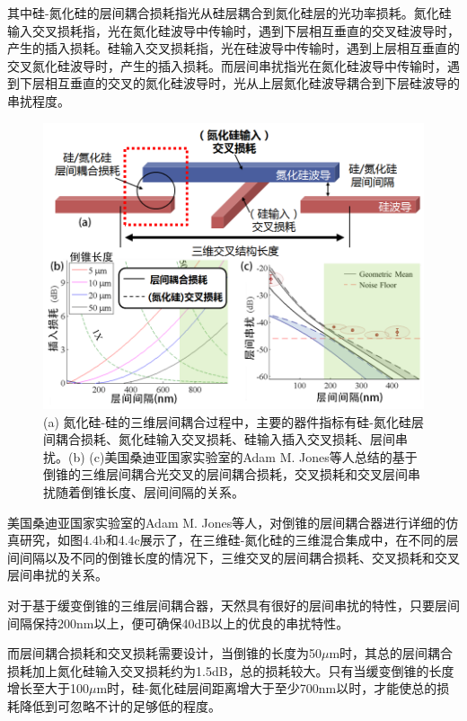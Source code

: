 其中硅-氮化硅的层间耦合损耗指光从硅层耦合到氮化硅层的光功率损耗。氮化硅输入交叉损耗指，光在氮化硅波导中传输时，遇到下层相互垂直的交叉硅波导时，产生的插入损耗。硅输入交叉损耗指，光在硅波导中传输时，遇到上层相互垂直的交叉氮化硅波导时，产生的插入损耗。而层间串扰指光在氮化硅波导中传输时，遇到下层相互垂直的交叉的氮化硅波导时，光从上层氮化硅波导耦合到下层硅波导的串扰程度。

\begin{figure}[!htbp]
    \centering
    \includegraphics[width=1\textwidth]{Img/4-4.png}
    \caption{(a) 氮化硅-硅的三维层间耦合过程中，主要的器件指标有硅-氮化硅层间耦合损耗、氮化硅输入交叉损耗、硅输入插入交叉损耗、层间串扰。(b) (c)美国桑迪亚国家实验室的Adam M. Jones等人总结的基于倒锥的三维层间耦合光交叉的层间耦合损耗，交叉损耗和交叉层间串扰随着倒锥长度、层间间隔的关系。 \cite{Jones2013Ultra}}
    \label{fig:4-4}
\end{figure}

美国桑迪亚国家实验室的Adam M. Jones等人，对倒锥的层间耦合器进行详细的仿真研究，如图4.4b和4.4c展示了，在三维硅-氮化硅的三维混合集成中，在不同的层间间隔以及不同的倒锥长度的情况下，三维交叉的层间耦合损耗、交叉损耗和交叉层间串扰的关系。\cite{Jones2013Ultra}

对于基于缓变倒锥的三维层间耦合器，天然具有很好的层间串扰的特性，只要层间间隔保持200nm以上，便可确保40dB以上的优良的串扰特性。

而层间耦合损耗和交叉损耗需要设计，当倒锥的长度为50$\mu$m时，其总的层间耦合损耗加上氮化硅输入交叉损耗约为1.5dB，总的损耗较大。只有当缓变倒锥的长度增长至大于100$\mu$m时，硅-氮化硅层间距离增大于至少700nm以时，才能使总的损耗降低到可忽略不计的足够低的程度。


